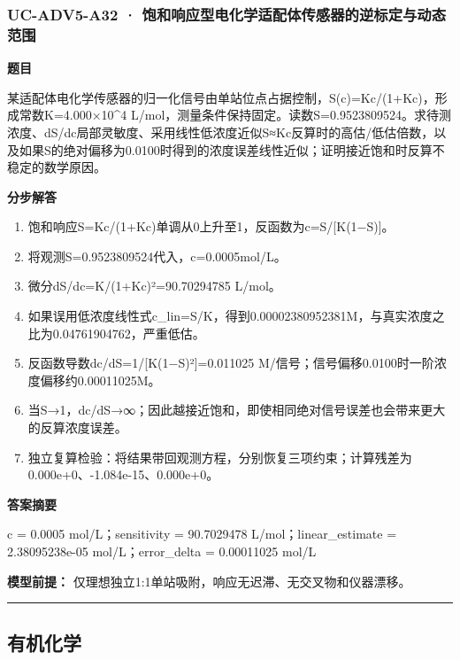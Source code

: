 \documentclass[UTF8,11pt,a4paper]{ctexart}
\begin{document}
\subsubsection*{UC-ADV5-A32 · 饱和响应型电化学适配体传感器的逆标定与动态范围}
\noindent\textbf{题目}\par
某适配体电化学传感器的归一化信号由单站位点占据控制，S(c)=Kc/(1+Kc)，形成常数K=4.000×10\textasciicircum{}4 L/mol，测量条件保持固定。读数S=0.9523809524。求待测浓度、dS/dc局部灵敏度、采用线性低浓度近似S≈Kc反算时的高估/低估倍数，以及如果S的绝对偏移为0.0100时得到的浓度误差线性近似；证明接近饱和时反算不稳定的数学原因。\par
\medskip\noindent\textbf{分步解答}
\begin{enumerate}
\item 饱和响应S=Kc/(1+Kc)单调从0上升至1，反函数为c=S/[K(1−S)]。
\item 将观测S=0.9523809524代入，c=0.0005mol/L。
\item 微分dS/dc=K/(1+Kc)²=90.70294785 L/mol。
\item 如果误用低浓度线性式c\_lin=S/K，得到0.00002380952381M，与真实浓度之比为0.04761904762，严重低估。
\item 反函数导数dc/dS=1/[K(1−S)²]=0.011025 M/信号；信号偏移0.0100时一阶浓度偏移约0.00011025M。
\item 当S→1，dc/dS→∞；因此越接近饱和，即使相同绝对信号误差也会带来更大的反算浓度误差。
\item 独立复算检验：将结果带回观测方程，分别恢复三项约束；计算残差为 0.000e+0、-1.084e-15、0.000e+0。
\end{enumerate}
\noindent\textbf{答案摘要}\par
c = 0.0005 mol/L；sensitivity = 90.7029478 L/mol；linear\_estimate = 2.38095238e-05 mol/L；error\_delta = 0.00011025 mol/L\par
\noindent\textbf{模型前提：}
仅理想独立1:1单站吸附，响应无迟滞、无交叉物和仪器漂移。\par
\medskip\hrule\medskip
\subsection*{有机化学}
\end{document}

